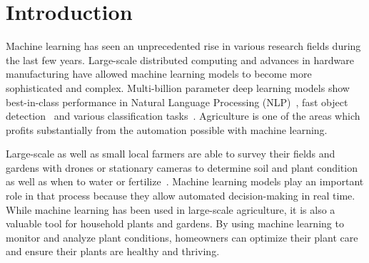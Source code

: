 \documentclass[draft,final]{vutinfth} %
\begin{document}
\frontmatter %

\addstatementpage

\begin{danksagung*}
\end{danksagung*}

\begin{acknowledgements*}
\end{acknowledgements*}

\begin{kurzfassung}
\end{kurzfassung}

\begin{abstract}
\end{abstract}


\tableofcontents %

\mainmatter

\chapter{Introduction}
\label{chap:introduction}

Machine learning has seen an unprecedented rise in various research
fields during the last few years. Large-scale distributed computing
and advances in hardware manufacturing have allowed machine learning
models to become more sophisticated and complex. Multi-billion
parameter deep learning models show best-in-class performance in
Natural Language Processing (NLP)~\cite{brown2020}, fast object
detection~\cite{bochkovskiy2020} and various classification
tasks~\cite{zhong2022,ariss2022}. Agriculture is one of the areas
which profits substantially from the automation possible with machine
learning.

Large-scale as well as small local farmers are able to survey their
fields and gardens with drones or stationary cameras to determine soil
and plant condition as well as when to water or
fertilize~\cite{ramos-giraldo2020}. Machine learning models play an
important role in that process because they allow automated
decision-making in real time. While machine learning has been used in
large-scale agriculture, it is also a valuable tool for household
plants and gardens. By using machine learning to monitor and analyze
plant conditions, homeowners can optimize their plant care and ensure
their plants are healthy and thriving.
\end{document}
